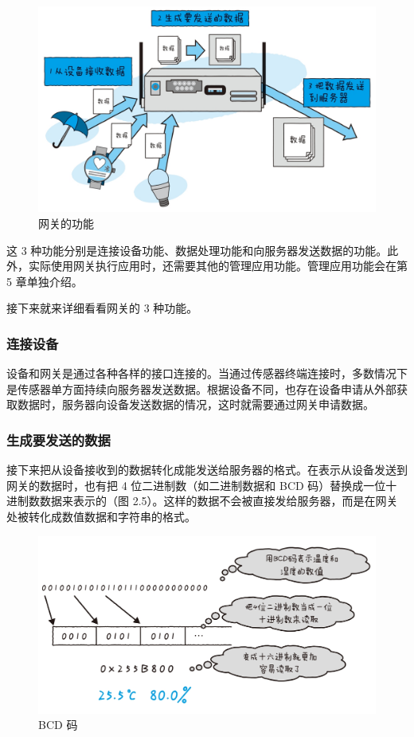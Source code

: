 \documentclass[12pt,UTF8]{ctexbook}
\begin{document}
\begin{figure}[htbp]
	\centering
	\includegraphics[width=1\linewidth]{23}
	\caption{网关的功能}
	\label{fig:1}
\end{figure}

这 3 种功能分别是连接设备功能、数据处理功能和向服务器发送数据的功能。此外，实际使用网关执行应用时，还需要其他的管理应用功能。管理应用功能会在第 5 章单独介绍。

接下来就来详细看看网关的 3 种功能。

\subsubsection{连接设备}

设备和网关是通过各种各样的接口连接的。当通过传感器终端连接时，多数情况下是传感器单方面持续向服务器发送数据。根据设备不同，也存在设备申请从外部获取数据时，服务器向设备发送数据的情况，这时就需要通过网关申请数据。

\subsubsection{生成要发送的数据}

接下来把从设备接收到的数据转化成能发送给服务器的格式。在表示从设备发送到网关的数据时，也有把 4 位二进制数（如二进制数据和 BCD 码）替换成一位十进制数数据来表示的（图 2.5）。这样的数据不会被直接发给服务器，而是在网关处被转化成数值数据和字符串的格式。

\begin{figure}[htbp]
	\centering
	\includegraphics[width=1\linewidth]{24}
	\caption{BCD 码}
	\label{fig:1}
\end{figure}
\end{document}
